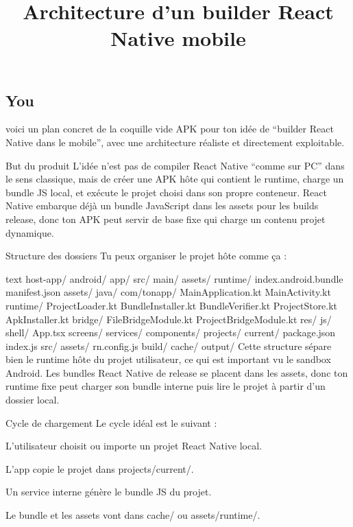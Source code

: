 \documentclass[11pt]{article}
\title{Architecture d'un builder React Native mobile}
\date{}
\begin{document}
\maketitle

\subsection*{You}

voici un plan concret de la coquille vide APK pour ton idée de “builder React Native dans le mobile”, avec une architecture réaliste et directement exploitable.

But du produit
L’idée n’est pas de compiler React Native “comme sur PC” dans le sens classique, mais de créer une APK hôte qui contient le runtime, charge un bundle JS local, et exécute le projet choisi dans son propre conteneur. React Native embarque déjà un bundle JavaScript dans les assets pour les builds release, donc ton APK peut servir de base fixe qui charge un contenu projet dynamique.

Structure des dossiers
Tu peux organiser le projet hôte comme ça :

text
host-app/
  android/
  app/
  src/
    main/
      assets/
        runtime/
          index.android.bundle
          manifest.json
          assets/
      java/
        com/tonapp/
          MainApplication.kt
          MainActivity.kt
          runtime/
            ProjectLoader.kt
            BundleInstaller.kt
            BundleVerifier.kt
            ProjectStore.kt
            ApkInstaller.kt
          bridge/
            FileBridgeModule.kt
            ProjectBridgeModule.kt
      res/
  js/
    shell/
      App.tsx
      screens/
      services/
      components/
  projects/
    current/
      package.json
      index.js
      src/
      assets/
      rn.config.js
  build/
  cache/
  output/
Cette structure sépare bien le runtime hôte du projet utilisateur, ce qui est important vu le sandbox Android. Les bundles React Native de release se placent dans les assets, donc ton runtime fixe peut charger son bundle interne puis lire le projet à partir d’un dossier local.

Cycle de chargement
Le cycle idéal est le suivant :

L’utilisateur choisit ou importe un projet React Native local.

L’app copie le projet dans projects/current/.

Un service interne génère le bundle JS du projet.

Le bundle et les assets vont dans cache/ ou assets/runtime/.
\end{document}
